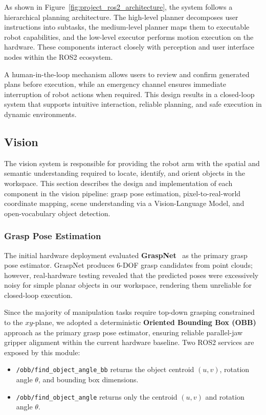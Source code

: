 \documentclass[12pt]{extarticle}
\begin{document}
As shown in Figure~\ref{fig:project_ros2_architecture}, the system follows a hierarchical planning architecture. The high-level planner decomposes user instructions into subtasks, the medium-level planner maps them to executable robot capabilities, and the low-level executor performs motion execution on the hardware. These components interact closely with perception and user interface nodes within the ROS2 ecosystem.

A human-in-the-loop mechanism allows users to review and confirm generated plans before execution, while an emergency channel ensures immediate interruption of robot actions when required. This design results in a closed-loop system that supports intuitive interaction, reliable planning, and safe execution in dynamic environments.

\subsection{Vision}

The vision system is responsible for providing the robot arm with the spatial and semantic understanding required to locate, identify, and orient objects in the workspace. This section describes the design and implementation of each component in the vision pipeline: grasp pose estimation, pixel-to-real-world coordinate mapping, scene understanding via a Vision-Language Model, and open-vocabulary object detection.

\subsubsection{Grasp Pose Estimation}

The initial hardware deployment evaluated \textbf{GraspNet}~\cite{fang2020graspnet} as the primary grasp pose estimator. GraspNet produces 6-DOF grasp candidates from point clouds; however, real-hardware testing revealed that the predicted poses were excessively noisy for simple planar objects in our workspace, rendering them unreliable for closed-loop execution.

Since the majority of manipulation tasks require top-down grasping constrained to the $xy$-plane, we adopted a deterministic \textbf{Oriented Bounding Box (OBB)} approach as the primary grasp pose estimator, ensuring reliable parallel-jaw gripper alignment within the current hardware baseline. Two ROS2 services are exposed by this module:

\begin{itemize}
    \item \texttt{/obb/find\_object\_angle\_bb} returns the object centroid $(u, v)$, rotation angle $\theta$, and bounding box dimensions.
    \item \texttt{/obb/find\_object\_angle} returns only the centroid $(u, v)$ and rotation angle $\theta$.
\end{itemize}
\end{document}
